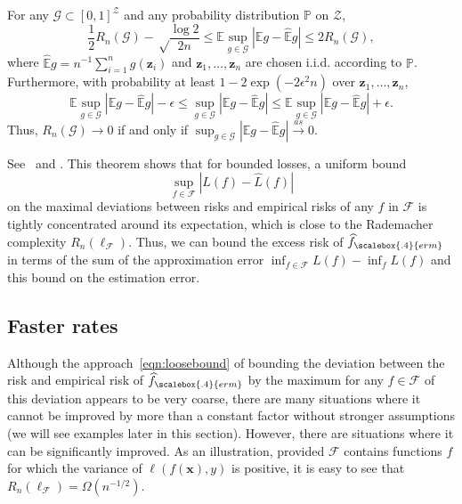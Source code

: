 \begin{theorem}\label{thm:Rad}
For any ${\mathcal G}\subset[0,1]^{{\mathcal Z}}$ and any probability distribution
$\mathbb{P}$
on ${\mathcal Z}$,
  \[
    \frac{1}{2}R_n({\mathcal G}) - \sqrt\frac{\log 2}{2n}
    \le {\mathbb E}\sup_{g\in{\mathcal G}}
      \left|{\mathbb E} g - \widehat{\mathbb E} g\right|
    \le 2R_n({\mathcal G}),
  \]
where $\widehat{\mathbb E} g=n^{-1}\sum_{i=1}^n g({\boldsymbol z}_i)$ and
${\boldsymbol z}_1,\ldots,{\boldsymbol z}_n$ are chosen i.i.d. according to $\mathbb{P}$.
Furthermore, with probability at least $1-2\exp(-2\epsilon^2 n)$ over
${\boldsymbol z}_1,\ldots,{\boldsymbol z}_n$,
  \[
    {\mathbb E}\sup_{g\in{\mathcal G}}
      \left|{\mathbb E} g - \widehat{\mathbb E} g\right|
        - \epsilon \le
    \sup_{g\in{\mathcal G}}
      \left|{\mathbb E} g - \widehat{\mathbb E} g\right|
    \le {\mathbb E}\sup_{g\in{\mathcal G}}
      \left|{\mathbb E} g - \widehat{\mathbb E} g\right|
        + \epsilon.
  \]
Thus, $R_n({\mathcal G})\to 0$ if and only if 
$\sup_{g\in{\mathcal G}}\left|{\mathbb E} g - \widehat{\mathbb E} g\right| \overset{as}{\rightarrow} 0$.
\end{theorem}

See~\cite{kp-rpbrfl-00,k-rpsrm-01,bbl-msee-02,
bm-rgcrbsr-02} and \cite{k-lrcaoiirm-06}. This theorem shows that for bounded losses, a uniform bound
  \[
    \sup_{f\in{\mathcal F}} \left|L(f) - \widehat L(f)\right|
  \]
on the maximal deviations between risks and empirical risks of any $f$ in ${\mathcal F}$ is tightly concentrated around its expectation, which is close to the Rademacher complexity $R_n(\ell_{{\mathcal F}})$.  Thus, we can bound the excess risk of $\widehat{f}_{\scalebox{.4}{erm}}$ in terms of the sum of the approximation error $\inf_{f\in{\mathcal F}}L(f) - \inf_{f}L(f)$ and this bound on the estimation error.

\subsection{Faster rates}

Although the approach~\eqref{eqn:loosebound} of bounding the deviation between the risk and empirical risk of $\widehat{f}_{\scalebox{.4}{erm}}$ by the maximum for any $f\in{\mathcal F}$ of this deviation appears to be very coarse, there are many situations where it cannot be improved by more than a constant factor without stronger assumptions (we will see examples later in this section). However, there are situations where it can be significantly improved. As an illustration, provided ${\mathcal F}$ contains functions $f$ for which the variance of $\ell(f({\boldsymbol x}),y)$ is positive, it is easy to see that
$R_n(\ell_{{\mathcal F}})=\Omega(n^{-1/2})$.

